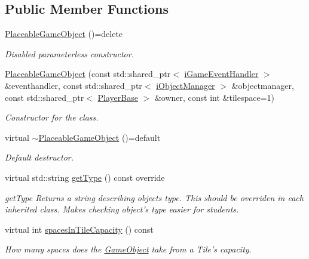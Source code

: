 \subsection*{Public Member Functions}
\begin{DoxyCompactItemize}
\item 
\hyperlink{classCourse_1_1PlaceableGameObject_adde506e2a75757799f54b14b464cf128}{Placeable\-Game\-Object} ()=delete
\begin{DoxyCompactList}\small\item\em Disabled parameterless constructor. \end{DoxyCompactList}\item 
\hyperlink{classCourse_1_1PlaceableGameObject_a021fe249f3a6de1daf8e0a85e772e57e}{Placeable\-Game\-Object} (const std\-::shared\-\_\-ptr$<$ \hyperlink{classCourse_1_1iGameEventHandler}{i\-Game\-Event\-Handler} $>$ \&eventhandler, const std\-::shared\-\_\-ptr$<$ \hyperlink{classCourse_1_1iObjectManager}{i\-Object\-Manager} $>$ \&objectmanager, const std\-::shared\-\_\-ptr$<$ \hyperlink{classCourse_1_1PlayerBase}{Player\-Base} $>$ \&owner, const int \&tilespace=1)
\begin{DoxyCompactList}\small\item\em Constructor for the class. \end{DoxyCompactList}\item 
virtual \hyperlink{classCourse_1_1PlaceableGameObject_ab0e0ad8ecd20bf48faefc6c51056066f}{$\sim$\-Placeable\-Game\-Object} ()=default
\begin{DoxyCompactList}\small\item\em Default destructor. \end{DoxyCompactList}\item 
virtual std\-::string \hyperlink{classCourse_1_1PlaceableGameObject_adcd0c91b52ccedd434092380644f210e}{get\-Type} () const override
\begin{DoxyCompactList}\small\item\em get\-Type Returns a string describing objects type. This should be overriden in each inherited class. Makes checking object's type easier for students. \end{DoxyCompactList}\item 
virtual int \hyperlink{classCourse_1_1PlaceableGameObject_a677e6c0afa7c9cc70123369f3d7dafcb}{spaces\-In\-Tile\-Capacity} () const 
\begin{DoxyCompactList}\small\item\em How many spaces does the \hyperlink{classCourse_1_1GameObject}{Game\-Object} take from a Tile's capacity. \end{DoxyCompactList}\item 

\end{DoxyCompactItemize}
